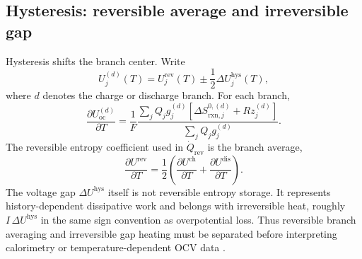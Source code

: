 \documentclass[11pt,a4paper]{article}
\newcommand{\rxn}{\mathrm{rxn}}
\newcommand{\rev}{\mathrm{rev}}
\newcommand{\oc}{\mathrm{oc}}
\newcommand{\hys}{\mathrm{hys}}
\begin{document}
\subsection{Hysteresis: reversible average and irreversible gap}
Hysteresis shifts the branch center. Write
\begin{equation}
U_j^{(d)}(T)=U_j^\rev(T)\pm\frac{1}{2}\Delta U_j^\hys(T),
\label{eq:hys_center}
\end{equation}
where $d$ denotes the charge or discharge branch. For each branch,
\begin{equation}
\frac{\partial U_\oc^{(d)}}{\partial T}
=\frac{1}{F}
\frac{\sum_j Q_jg_j^{(d)}
\left[\Delta S^{0,(d)}_{\rxn,j}+Rz_j^{(d)}\right]}
{\sum_j Q_jg_j^{(d)}}.
\label{eq:hys_branch}
\end{equation}
The reversible entropy coefficient used in $\dot Q_\rev$ is the branch average,
\begin{equation}
\frac{\partial U^\rev}{\partial T}
=\frac{1}{2}\left(
\frac{\partial U^\mathrm{ch}}{\partial T}
+\frac{\partial U^\mathrm{dis}}{\partial T}\right).
\label{eq:hys_rev}
\end{equation}
The voltage gap $\Delta U^\hys$ itself is not reversible entropy storage. It represents
history-dependent dissipative work and belongs with irreversible heat, roughly
$I\,\Delta U^\hys$ in the same sign convention as overpotential loss. Thus reversible
branch averaging and irreversible gap heating must be separated before interpreting
calorimetry or temperature-dependent OCV data \cite{hysteresis2018}.
\end{document}
